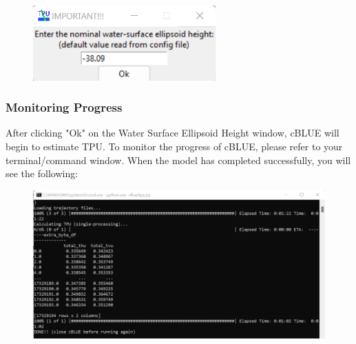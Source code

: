 \documentclass[11pt, a4paper]{article}
\begin{document}
\begin{figure}[H]
    \centering
    \includegraphics[width=7cm]{figs/nom_h20_surf.png}
\end{figure}

\subsubsection{Monitoring Progress}
After clicking "Ok" on the Water Surface Ellipsoid Height window, cBLUE will begin to estimate TPU. To monitor the progress of cBLUE, please refer to your terminal/command window. When the model has completed successfully, you will see the following:
\begin{figure}[H]
    \centering
    \includegraphics[width=15cm]{figs/terminal_output.png}
\end{figure}
\end{document}
